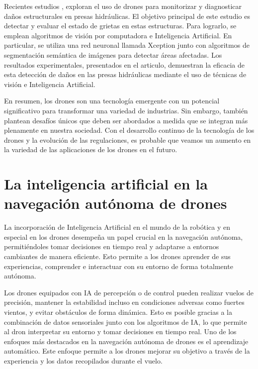 Recientes estudios \cite{rs15030615}, exploran el uso de drones
para monitorizar y diagnosticar daños estructurales en presas hidráulicas. El objetivo principal de este estudio es detectar y evaluar el estado de  grietas en estas estructuras. Para lograrlo, 
se emplean algoritmos de visión por computadora e Inteligencia Artificial. 
En particular, se utiliza una red neuronal llamada Xception \cite{Deeplabv3} junto con algoritmos de segmentación semántica de imágenes para detectar áreas afectadas. Los resultados experimentales, 
presentados en el articulo, demuestran la eficacia de esta detección de daños en las presas hidráulicas mediante el uso de técnicas de visión e Inteligencia Artificial. 

En resumen, los drones son una tecnología emergente con un potencial significativo
para transformar una variedad de industrias. Sin embargo, también plantean desafíos únicos que deben ser abordados a medida que se integran más plenamente en nuestra
sociedad. Con el desarrollo continuo de la tecnología de los drones y la evolución de las
regulaciones, es probable que veamos un aumento en la variedad de las aplicaciones de
los drones en el futuro. 


\section{La inteligencia artificial en la navegación autónoma de drones}
\label{sec:IA}

La incorporación de Inteligencia Artificial en el mundo de la robótica y en especial en los drones desempeña un papel crucial en la navegación autónoma, permitiéndoles tomar decisiones en 
tiempo real y adaptarse 
a entornos cambiantes de manera eficiente. Esto permite a los drones aprender de sus experiencias, comprender e interactuar con su entorno de forma totalmente autónoma.

Los drones equipados con IA de percepción o de control pueden realizar vuelos de precisión, mantener la estabilidad incluso en condiciones adversas como fuertes vientos, y evitar obstáculos 
de forma dinámica. Esto es posible gracias a la combinación de datos sensoriales junto con los algoritmos de IA, lo que permite 
al dron interpretar su entorno y tomar decisiones en tiempo real. Uno de los enfoques más destacados en la navegación autónoma de drones es el aprendizaje automático. Este enfoque permite a los drones mejorar su objetivo a través de la experiencia 
y los datos recopilados durante el vuelo. 

